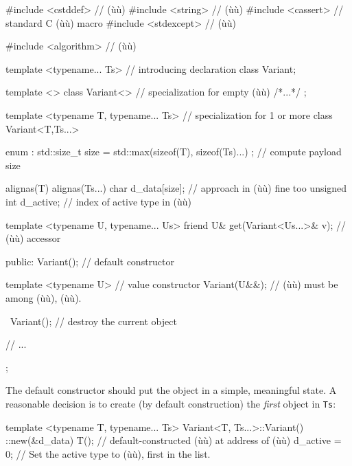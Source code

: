 \begin{emcppshiddenlisting}[emcppsbatch={e38,e39},emcppsstandards={c++14}]
#include <cstddef>  // (ù{}ù)
#include <string>   // (ù{}ù)
#include <cassert>  // standard C (ù{}ù) macro
#include <stdexcept>  // (ù{}ù)
\end{emcppshiddenlisting}
\begin{emcppslisting}[emcppsbatch={e38,e39}]
#include <algorithm>  // (ù{}ù)

template <typename... Ts>              // introducing declaration
class Variant;

template <> class Variant<>            // specialization for empty (ù{}ù)
{ /*...*/ };

template <typename T, typename... Ts>  // specialization for 1 or more
class Variant<T,Ts...>
{
    enum : std::size_t { size = std::max({sizeof(T), sizeof(Ts)...}) };
        // compute payload size

    alignas(T) alignas(Ts...)
    char d_data[size];                 // approach in (ù{}ù) fine too
    unsigned int d_active;             // index of active type in (ù{}ù)

    template <typename U, typename... Us>
    friend U& get(Variant<Us...>& v);  // (ù{}ù) accessor

public:
    Variant();                         // default constructor

    template <typename U>              // value constructor
    Variant(U&&);                      // (ù{}ù) must be among (ù{}ù), (ù{}ù).

    ~Variant();                        // destroy the current object

    // ...
};
\end{emcppslisting}
    

\noindent The default constructor should put the object in a simple, meaningful
state. A reasonable decision is to create (by default construction) the
\emph{first} object in \lstinline!Ts!:

\begin{emcppslisting}[emcppsbatch={e38,e39}]
template <typename T, typename... Ts>
Variant<T, Ts...>::Variant()
{
    ::new(&d_data) T();  // default-constructed (ù{}ù) at address of (ù{}ù)
    d_active = 0;        // Set the active type to (ù{}ù), first in the list.
}
\end{emcppslisting}
    

